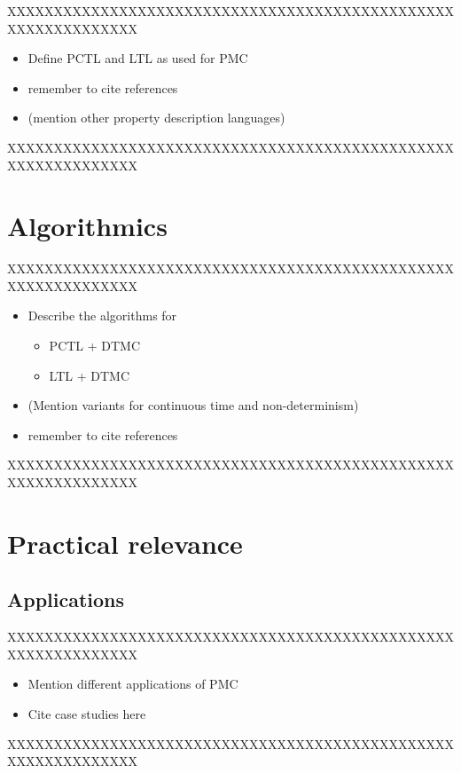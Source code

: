 \documentclass[12pt,a4paper]{article}
\begin{document}
XXXXXXXXXXXXXXXXXXXXXXXXXXXXXXXXXXXXXXXXXXXXXXXXXXXXXXXXXXXXXX

\begin{itemize}
\item Define PCTL and LTL as used for PMC
\item remember to cite references
\item (mention other property description languages)
\end{itemize}

XXXXXXXXXXXXXXXXXXXXXXXXXXXXXXXXXXXXXXXXXXXXXXXXXXXXXXXXXXXXXX

\section{Algorithmics}
XXXXXXXXXXXXXXXXXXXXXXXXXXXXXXXXXXXXXXXXXXXXXXXXXXXXXXXXXXXXXX

\begin{itemize}
\item Describe the algorithms for
\begin{itemize}
\item PCTL + DTMC
\item LTL + DTMC
\end{itemize}
\item (Mention variants for continuous time and non-determinism) 
\item remember to cite references
\end{itemize}

XXXXXXXXXXXXXXXXXXXXXXXXXXXXXXXXXXXXXXXXXXXXXXXXXXXXXXXXXXXXXX




\section{Practical relevance}
\subsection{Applications}

XXXXXXXXXXXXXXXXXXXXXXXXXXXXXXXXXXXXXXXXXXXXXXXXXXXXXXXXXXXXXX

\begin{itemize}
\item Mention different applications of PMC
\item Cite case studies here
\end{itemize}

XXXXXXXXXXXXXXXXXXXXXXXXXXXXXXXXXXXXXXXXXXXXXXXXXXXXXXXXXXXXXX
\end{document}
